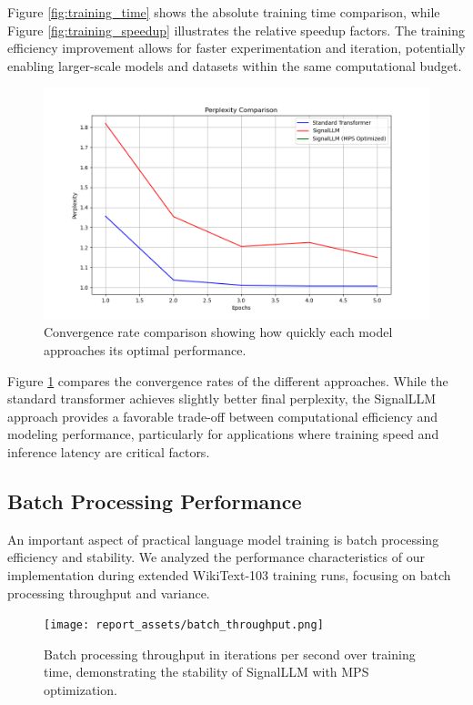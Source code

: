 \documentclass[10pt,twocolumn,letterpaper]{article}
\begin{document}
Figure \ref{fig:training_time} shows the absolute training time comparison, while Figure \ref{fig:training_speedup} illustrates the relative speedup factors. The training efficiency improvement allows for faster experimentation and iteration, potentially enabling larger-scale models and datasets within the same computational budget.

\begin{figure}[t]
    \centering
    \includegraphics[width=0.9\linewidth]{report_assets/convergence_rate.png}
    \caption{Convergence rate comparison showing how quickly each model approaches its optimal performance.}
    \label{fig:convergence}
\end{figure}

Figure \ref{fig:convergence} compares the convergence rates of the different approaches. While the standard transformer achieves slightly better final perplexity, the SignalLLM approach provides a favorable trade-off between computational efficiency and modeling performance, particularly for applications where training speed and inference latency are critical factors.

\subsection{Batch Processing Performance}

An important aspect of practical language model training is batch processing efficiency and stability. We analyzed the performance characteristics of our implementation during extended WikiText-103 training runs, focusing on batch processing throughput and variance.

\begin{figure}[t]
    \centering
    \texttt{[image: report\_assets/batch\_throughput.png]}
    \caption{Batch processing throughput in iterations per second over training time, demonstrating the stability of SignalLLM with MPS optimization.}
    \label{fig:batch_throughput}
\end{figure}
\end{document}
